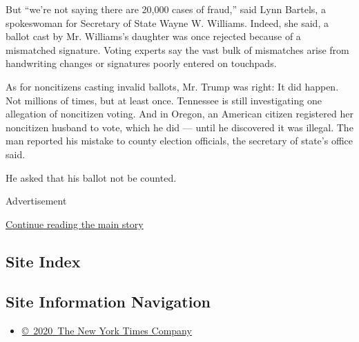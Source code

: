 But ``we're not saying there are 20,000 cases of fraud,'' said Lynn
Bartels, a spokeswoman for Secretary of State Wayne W. Williams. Indeed,
she said, a ballot cast by Mr. Williams's daughter was once rejected
because of a mismatched signature. Voting experts say the vast bulk of
mismatches arise from handwriting changes or signatures poorly entered
on touchpads.

As for noncitizens casting invalid ballots, Mr. Trump was right: It did
happen. Not millions of times, but at least once. Tennessee is still
investigating one allegation of noncitizen voting. And in Oregon, an
American citizen registered her noncitizen husband to vote, which he did
--- until he discovered it was illegal. The man reported his mistake to
county election officials, the secretary of state's office said.

He asked that his ballot not be counted.

Advertisement

\protect\hyperlink{after-bottom}{Continue reading the main story}

\hypertarget{site-index}{%
\subsection{Site Index}\label{site-index}}

\hypertarget{site-information-navigation}{%
\subsection{Site Information
Navigation}\label{site-information-navigation}}

\begin{itemize}
\tightlist
\item
  \href{https://help.nytimes3xbfgragh.onion/hc/en-us/articles/115014792127-Copyright-notice}{©~2020~The
  New York Times Company}
\end{itemize}

